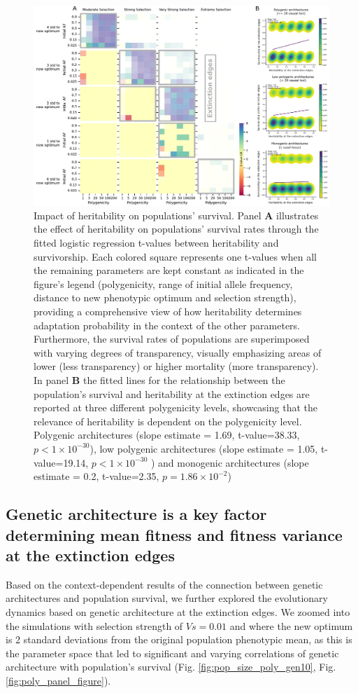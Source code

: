 \documentclass{article}
\begin{document}
\begin{figure}[h]
  \centering
  \includegraphics[width=1\textwidth]{figures/heristabilityvs_survivo_edges.pdf}
  \caption{Impact of heritability on populations' survival. Panel \textbf{A} illustrates the effect of heritability on populations' survival rates through the fitted logistic regression t-values between heritability and survivorship. Each colored square represents one t-values when all the remaining parameters are kept constant as indicated in the figure's legend (polygenicity, range of initial allele frequency, distance to new phenotypic optimum and selection strength), providing a comprehensive view of how heritability determines adaptation probability in the context of the other parameters. Furthermore, the survival rates of populations are superimposed with varying degrees of transparency, visually emphasizing areas of lower (less transparency) or higher mortality (more transparency). In panel \textbf{B} the fitted lines for the relationship between the population's survival and heritability at the extinction edges are reported at three different polygenicity levels, showcasing that the relevance of heritability is dependent on the polygenicity level. Polygenic architectures (slope estimate = 1.69, t-value=38.33, $p<1 \times 10^{-30}$), low polygenic architectures (slope estimate = 1.05, t-value=19.14, $p<1 \times 10^{-30}$ ) and monogenic architectures (slope estimate = 0.2, t-value=2.35, $p=1.86 \times 10^{-2}$)}
  \label{fig:h2_panel_figure}
\end{figure}

\subsection{Genetic architecture is a key factor determining mean fitness and fitness variance at the extinction edges}
Based on the context-dependent results of the connection between genetic architectures and population survival, we further explored the evolutionary dynamics based on genetic architecture at the extinction edges. We zoomed into the simulations with selection strength of $Vs=0.01$ and where the new optimum is 2 standard deviations from the original population phenotypic mean, as this is the parameter space that led to significant and varying correlations of genetic architecture with population's survival (Fig. \ref{fig:pop_size_poly_gen10}, Fig. \ref{fig:poly_panel_figure}). 
\end{document}
